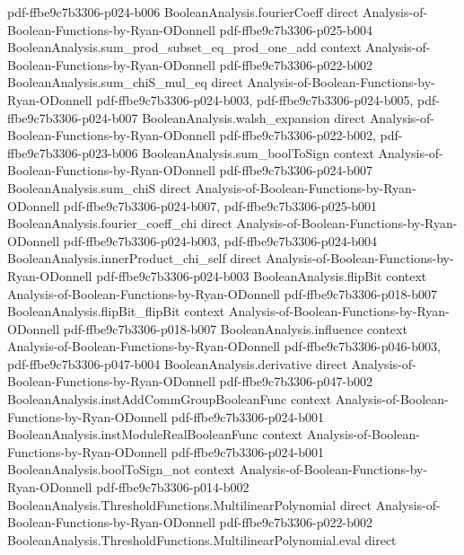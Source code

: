 \begin{lemma}
{    pdf-ffbe9c7b3306-p024-b006}
\proofstep
  {BooleanAnalysis.fourierCoeff}
  {direct}
  {Analysis-of-Boolean-Functions-by-Ryan-ODonnell}
  {pdf-ffbe9c7b3306-p025-b004}
\proofstep
  {BooleanAnalysis.sum_prod_subset_eq_prod_one_add}
  {context}
  {Analysis-of-Boolean-Functions-by-Ryan-ODonnell}
  {pdf-ffbe9c7b3306-p022-b002}
\proofstep
  {BooleanAnalysis.sum_chiS_mul_eq}
  {direct}
  {Analysis-of-Boolean-Functions-by-Ryan-ODonnell}
  {pdf-ffbe9c7b3306-p024-b003,
    pdf-ffbe9c7b3306-p024-b005,
    pdf-ffbe9c7b3306-p024-b007}
\proofstep
  {BooleanAnalysis.walsh_expansion}
  {direct}
  {Analysis-of-Boolean-Functions-by-Ryan-ODonnell}
  {pdf-ffbe9c7b3306-p022-b002,
    pdf-ffbe9c7b3306-p023-b006}
\proofstep
  {BooleanAnalysis.sum_boolToSign}
  {context}
  {Analysis-of-Boolean-Functions-by-Ryan-ODonnell}
  {pdf-ffbe9c7b3306-p024-b007}
\proofstep
  {BooleanAnalysis.sum_chiS}
  {direct}
  {Analysis-of-Boolean-Functions-by-Ryan-ODonnell}
  {pdf-ffbe9c7b3306-p024-b007,
    pdf-ffbe9c7b3306-p025-b001}
\proofstep
  {BooleanAnalysis.fourier_coeff_chi}
  {direct}
  {Analysis-of-Boolean-Functions-by-Ryan-ODonnell}
  {pdf-ffbe9c7b3306-p024-b003,
    pdf-ffbe9c7b3306-p024-b004}
\proofstep
  {BooleanAnalysis.innerProduct_chi_self}
  {direct}
  {Analysis-of-Boolean-Functions-by-Ryan-ODonnell}
  {pdf-ffbe9c7b3306-p024-b003}
\proofstep
  {BooleanAnalysis.flipBit}
  {context}
  {Analysis-of-Boolean-Functions-by-Ryan-ODonnell}
  {pdf-ffbe9c7b3306-p018-b007}
\proofstep
  {BooleanAnalysis.flipBit_flipBit}
  {context}
  {Analysis-of-Boolean-Functions-by-Ryan-ODonnell}
  {pdf-ffbe9c7b3306-p018-b007}
\proofstep
  {BooleanAnalysis.influence}
  {context}
  {Analysis-of-Boolean-Functions-by-Ryan-ODonnell}
  {pdf-ffbe9c7b3306-p046-b003,
    pdf-ffbe9c7b3306-p047-b004}
\proofstep
  {BooleanAnalysis.derivative}
  {direct}
  {Analysis-of-Boolean-Functions-by-Ryan-ODonnell}
  {pdf-ffbe9c7b3306-p047-b002}
\proofstep
  {BooleanAnalysis.instAddCommGroupBooleanFunc}
  {context}
  {Analysis-of-Boolean-Functions-by-Ryan-ODonnell}
  {pdf-ffbe9c7b3306-p024-b001}
\proofstep
  {BooleanAnalysis.instModuleRealBooleanFunc}
  {context}
  {Analysis-of-Boolean-Functions-by-Ryan-ODonnell}
  {pdf-ffbe9c7b3306-p024-b001}
\proofstep
  {BooleanAnalysis.boolToSign_not}
  {context}
  {Analysis-of-Boolean-Functions-by-Ryan-ODonnell}
  {pdf-ffbe9c7b3306-p014-b002}
\proofstep
  {BooleanAnalysis.ThresholdFunctions.MultilinearPolynomial}
  {direct}
  {Analysis-of-Boolean-Functions-by-Ryan-ODonnell}
  {pdf-ffbe9c7b3306-p022-b002}
\proofstep
  {BooleanAnalysis.ThresholdFunctions.MultilinearPolynomial.eval}
  {direct}

\end{lemma}
